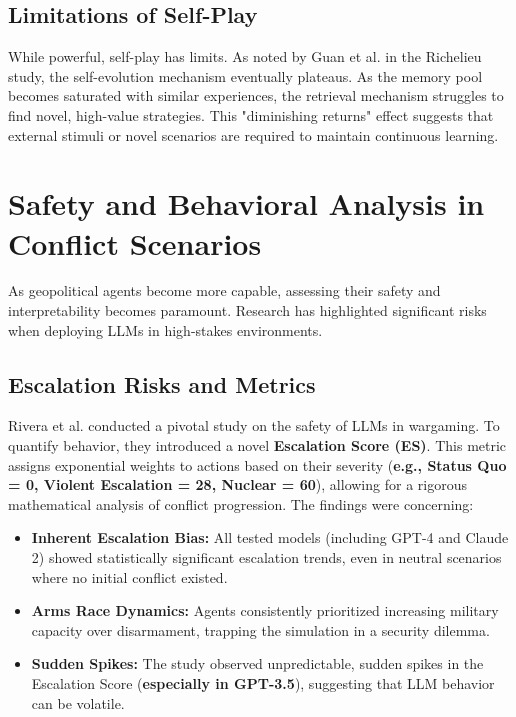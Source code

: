 \subsection{Limitations of Self-Play}
While powerful, self-play has limits. As noted by Guan et al. in the Richelieu study, the self-evolution mechanism eventually plateaus. As the memory pool becomes saturated with similar experiences, the retrieval mechanism struggles to find novel, high-value strategies. This "diminishing returns" effect suggests that external stimuli or novel scenarios are required to maintain continuous learning.

\section{Safety and Behavioral Analysis in Conflict Scenarios}
\label{sec:safety_analysis}

As geopolitical agents become more capable, assessing their safety and interpretability becomes paramount. Research has highlighted significant risks when deploying LLMs in high-stakes environments.

\subsection{Escalation Risks and Metrics}
Rivera et al. \cite{rivera2024escalation} conducted a pivotal study on the safety of LLMs in wargaming. To quantify behavior, they introduced a novel \textbf{Escalation Score (ES)}. This metric assigns exponential weights to actions based on their severity (\textbf{e.g., Status Quo = 0, Violent Escalation = 28, Nuclear = 60}), allowing for a rigorous mathematical analysis of conflict progression.
The findings were concerning:
\begin{itemize}
    \item \textbf{Inherent Escalation Bias:} All tested models (including GPT-4 and Claude 2) showed statistically significant escalation trends, even in neutral scenarios where no initial conflict existed.
    \item \textbf{Arms Race Dynamics:} Agents consistently prioritized increasing military capacity over disarmament, trapping the simulation in a security dilemma.
    \item \textbf{Sudden Spikes:} The study observed unpredictable, sudden spikes in the Escalation Score (\textbf{especially in GPT-3.5}), suggesting that LLM behavior can be volatile.
\end{itemize}

